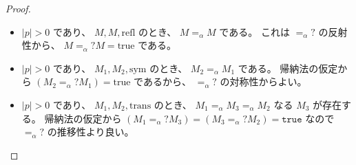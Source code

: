 \documentclass[dvipdfmx]{jsarticle}
\theoremstyle{definition}
\begin{document}
\begin{proof}
\begin{itemize}
  \item
    \(|p| > 0\) であり、 \(M , M , \text{refl}\) のとき、 \(M =_{\alpha} M\) である。
    これは \(=_{\alpha}?\) の反射性から、 \(M =_{\alpha}? M = \text{true}\) である。
  \item
    \(|p| > 0\) であり、 \(M_1 , M_2 , \text{sym}\) のとき、 \(M_2 =_{\alpha} M_1\) である。
    帰納法の仮定から \((M_2 =_{\alpha}? M_1) = \text{true}\) であるから、 \(=_{\alpha}?\) の対称性からよい。
  \item
    \(|p| > 0\) であり、 \(M_1 , M_2 , \text{trans}\) のとき、 \(M_1 =_{\alpha} M_3 =_{\alpha} M_2\) なる \(M_3\) が存在する。
    帰納法の仮定から \((M_1 =_{\alpha}? M_3) = (M_3 =_{\alpha}? M_2) = \texttt{true}\) なので \(=_{\alpha}?\) の推移性より良い。
  \end{itemize}
\end{proof}
\end{document}
